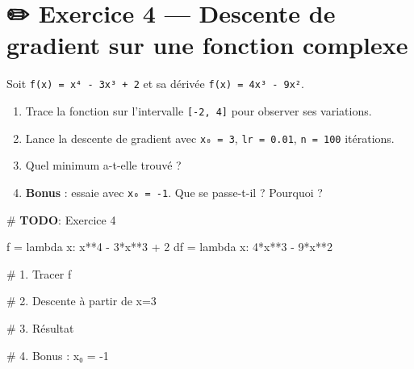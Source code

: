 \documentclass[
  french,
  11pt,
  a4paper,
]{scrbook}
\newenvironment{Shaded}{}{}
\newcommand{\AlertTok}[1]{\textcolor[rgb]{1.00,0.33,0.33}{\textbf{#1}}}
\newcommand{\CommentTok}[1]{\textcolor[rgb]{0.42,0.45,0.49}{#1}}
\newcommand{\DecValTok}[1]{\textcolor[rgb]{0.00,0.36,0.77}{#1}}
\newcommand{\KeywordTok}[1]{\textcolor[rgb]{0.84,0.23,0.29}{#1}}
\newcommand{\NormalTok}[1]{\textcolor[rgb]{0.14,0.16,0.18}{#1}}
\newcommand{\OperatorTok}[1]{\textcolor[rgb]{0.14,0.16,0.18}{#1}}
\providecommand{\tightlist}{%
  \setlength{\itemsep}{0pt}\setlength{\parskip}{0pt}}
\begin{document}
\section{✏️ Exercice 4 --- Descente de gradient sur une fonction
complexe}\label{exercice-4-descente-de-gradient-sur-une-fonction-complexe}

\begin{tcolorbox}[enhanced jigsaw, arc=.35mm, bottomrule=.15mm, bottomtitle=1mm, breakable, colback=white, colbacktitle=quarto-callout-note-color!10!white, colframe=quarto-callout-note-color-frame, coltitle=black, left=2mm, leftrule=.75mm, opacityback=0, opacitybacktitle=0.6, rightrule=.15mm, title={📝 Énoncé}, titlerule=0mm, toprule=.15mm, toptitle=1mm]

Soit \texttt{f(x)\ =\ x⁴\ -\ 3x³\ +\ 2} et sa dérivée
\texttt{f\textquotesingle{}(x)\ =\ 4x³\ -\ 9x²}.

\begin{enumerate}
\def\labelenumi{\arabic{enumi}.}
\tightlist
\item
  Trace la fonction sur l'intervalle \texttt{{[}-2,\ 4{]}} pour observer
  ses variations.
\item
  Lance la descente de gradient avec \texttt{x₀\ =\ 3},
  \texttt{lr\ =\ 0.01}, \texttt{n\ =\ 100} itérations.
\item
  Quel minimum a-t-elle trouvé ?
\item
  \textbf{Bonus} : essaie avec \texttt{x₀\ =\ -1}. Que se passe-t-il ?
  Pourquoi ?
\end{enumerate}

\end{tcolorbox}

\begin{Shaded}
\begin{Highlighting}[]
\CommentTok{\# }\AlertTok{TODO}\CommentTok{: Exercice 4}

\NormalTok{f }\OperatorTok{=} \KeywordTok{lambda}\NormalTok{ x: x}\OperatorTok{**}\DecValTok{4} \OperatorTok{{-}} \DecValTok{3}\OperatorTok{*}\NormalTok{x}\OperatorTok{**}\DecValTok{3} \OperatorTok{+} \DecValTok{2}
\NormalTok{df }\OperatorTok{=} \KeywordTok{lambda}\NormalTok{ x: }\DecValTok{4}\OperatorTok{*}\NormalTok{x}\OperatorTok{**}\DecValTok{3} \OperatorTok{{-}} \DecValTok{9}\OperatorTok{*}\NormalTok{x}\OperatorTok{**}\DecValTok{2}

\CommentTok{\# 1. Tracer f}


\CommentTok{\# 2. Descente à partir de x=3}


\CommentTok{\# 3. Résultat}


\CommentTok{\# 4. Bonus : x₀ = {-}1}
\end{Highlighting}
\end{Shaded}
\end{document}
